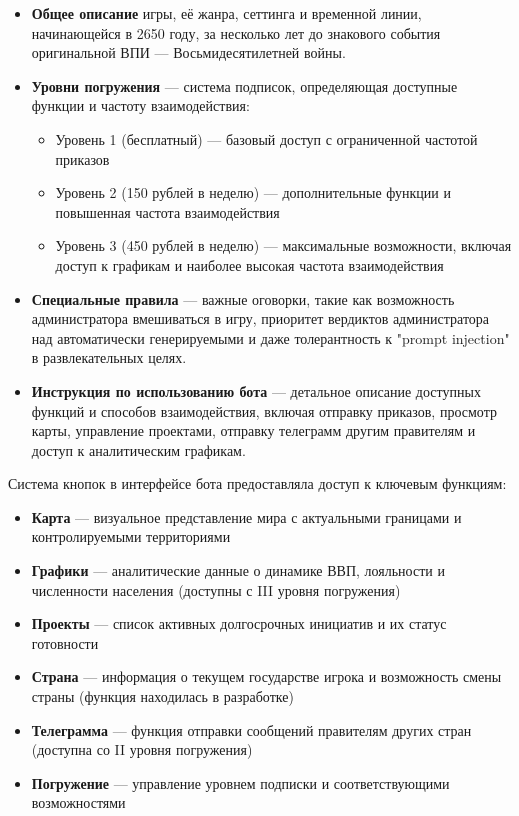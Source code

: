 \begin{itemize}
    \item \textbf{Общее описание} игры, её жанра, сеттинга и временной линии, начинающейся в 2650 году, за несколько лет до знакового события оригинальной ВПИ — Восьмидесятилетней войны.

    \item \textbf{Уровни погружения} — система подписок, определяющая доступные функции и частоту взаимодействия:
    \begin{itemize}
        \item Уровень 1 (бесплатный) — базовый доступ с ограниченной частотой приказов
        \item Уровень 2 (150 рублей в неделю) — дополнительные функции и повышенная частота взаимодействия
        \item Уровень 3 (450 рублей в неделю) — максимальные возможности, включая доступ к графикам и наиболее высокая частота взаимодействия
    \end{itemize}

    \item \textbf{Специальные правила} — важные оговорки, такие как возможность администратора вмешиваться в игру, приоритет вердиктов администратора над автоматически генерируемыми и даже толерантность к "prompt injection" в развлекательных целях.

    \item \textbf{Инструкция по использованию бота} — детальное описание доступных функций и способов взаимодействия, включая отправку приказов, просмотр карты, управление проектами, отправку телеграмм другим правителям и доступ к аналитическим графикам.
\end{itemize}

Система кнопок в интерфейсе бота предоставляла доступ к ключевым функциям:

\begin{itemize}
    \item \textbf{Карта} — визуальное представление мира с актуальными границами и контролируемыми территориями
    \item \textbf{Графики} — аналитические данные о динамике ВВП, лояльности и численности населения (доступны с III уровня погружения)
    \item \textbf{Проекты} — список активных долгосрочных инициатив и их статус готовности
    \item \textbf{Страна} — информация о текущем государстве игрока и возможность смены страны (функция находилась в разработке)
    \item \textbf{Телеграмма} — функция отправки сообщений правителям других стран (доступна со II уровня погружения)
    \item \textbf{Погружение} — управление уровнем подписки и соответствующими возможностями
\end{itemize}

